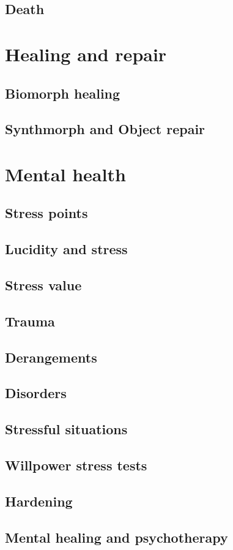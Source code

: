 \subsection{Death}

\section{Healing and repair}
\label{sec:healing-repair}

\subsection{Biomorph healing}

\subsection{Synthmorph and Object repair}

\section{Mental health}
\label{sec:mental-health}

\subsection{Stress points}

\subsection{Lucidity and stress}

\subsection{Stress value}

\subsection{Trauma}

\subsection{Derangements}

\subsection{Disorders}

\subsection{Stressful situations}

\subsection{Willpower stress tests}

\subsection{Hardening}

\subsection{Mental healing and psychotherapy}

